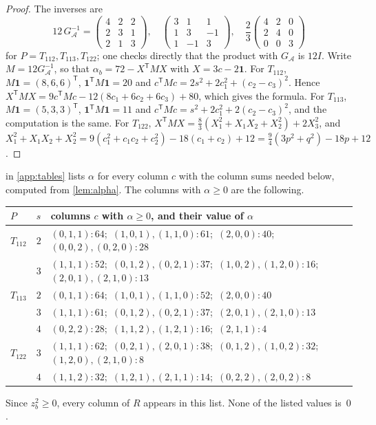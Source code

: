 \documentclass[11pt,a4paper]{amsart}
\theoremstyle{definition}
\theoremstyle{remark}
\newcommand{\one}{\mathbf{1}}
\newcommand{\cA}{\mathcal{A}}
\newcommand{\T}{\mathsf{T}}
\begin{document}
\begin{proof}
The inverses are
\[
12\,G^{-1}_\cA=\begin{pmatrix}4&2&2\\2&3&1\\2&1&3\end{pmatrix},\quad
\begin{pmatrix}3&1&1\\1&3&-1\\1&-1&3\end{pmatrix},\quad
\frac23\begin{pmatrix}4&2&0\\2&4&0\\0&0&3\end{pmatrix}
\]
for $P=T_{112},T_{113},T_{122}$; one checks directly that the product with $G_\cA$ is $12I$. Write $M=12G_\cA^{-1}$,
so that $\alpha_b=72-X^{\T}MX$ with $X=3c-2\one$. For $T_{112}$, $M\one=(8,6,6)^{\T}$, $\one^{\T}M\one=20$ and
$c^{\T}Mc=2s^2+2c_1^2+(c_2-c_3)^2$. Hence
$X^{\T}MX=9c^{\T}Mc-12(8c_1+6c_2+6c_3)+80$, which gives the formula. For $T_{113}$, $M\one=(5,3,3)^{\T}$,
$\one^{\T}M\one=11$ and $c^{\T}Mc=s^2+2c_1^2+2(c_2-c_3)^2$, and the computation is the same. For $T_{122}$,
$X^{\T}MX=\frac83(X_1^2+X_1X_2+X_2^2)+2X_3^2$, and
$X_1^2+X_1X_2+X_2^2=9(c_1^2+c_1c_2+c_2^2)-18(c_1+c_2)+12=\frac94(3p^2+q^2)-18p+12$.
\end{proof}

 in \cref{app:tables} lists $\alpha$ for every column $c$ with the column sums needed below,
computed from \cref{lem:alpha}. The columns with $\alpha\ge0$ are the following.
\begin{center}\small
\begin{tabular}{@{}lll@{}}
\toprule
$P$ & $s$ & columns $c$ with $\alpha\ge0$, and their value of $\alpha$\\
\midrule
$T_{112}$ & $2$ & $(0,1,1)\!:64$;\ $(1,0,1),(1,1,0)\!:61$;\ $(2,0,0)\!:40$;\ $(0,0,2),(0,2,0)\!:28$\\
          & $3$ & $(1,1,1)\!:52$;\ $(0,1,2),(0,2,1)\!:37$;\ $(1,0,2),(1,2,0)\!:16$;\ $(2,0,1),(2,1,0)\!:13$\\
\midrule
$T_{113}$ & $2$ & $(0,1,1)\!:64$;\ $(1,0,1),(1,1,0)\!:52$;\ $(2,0,0)\!:40$\\
          & $3$ & $(1,1,1)\!:61$;\ $(0,1,2),(0,2,1)\!:37$;\ $(2,0,1),(2,1,0)\!:13$\\
          & $4$ & $(0,2,2)\!:28$;\ $(1,1,2),(1,2,1)\!:16$;\ $(2,1,1)\!:4$\\
\midrule
$T_{122}$ & $3$ & $(1,1,1)\!:62$;\ $(0,2,1),(2,0,1)\!:38$;\ $(0,1,2),(1,0,2)\!:32$;\ $(1,2,0),(2,1,0)\!:8$\\
          & $4$ & $(1,1,2)\!:32$;\ $(1,2,1),(2,1,1)\!:14$;\ $(0,2,2),(2,0,2)\!:8$\\
\bottomrule
\end{tabular}
\end{center}
Since $z_b^2\ge0$, every column of $R$ appears in this list. None of the listed values is~$0$.
\end{document}
